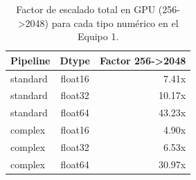 \begin{table}[htbp]
\centering
\renewcommand{\arraystretch}{1.2}
\setlength{\tabcolsep}{7pt}
\begin{tabular}{|l|c|r|}
\hline
\rowcolor[gray]{0.90}
\textbf{Pipeline} & \textbf{Dtype} & \textbf{Factor 256->2048} \\
\hline
standard & float16 & 7.41x \\
\hline
standard & float32 & 10.17x \\
\hline
standard & float64 & 43.23x \\
\hline
complex & float16 & 4.90x \\
\hline
complex & float32 & 6.53x \\
\hline
complex & float64 & 30.97x \\
\hline
\end{tabular}
\caption{Factor de escalado total en GPU (256->2048) para cada tipo numérico en el Equipo 1.}
\label{tab:resolution_scaling_by_dtype_equipo1}
\end{table}
